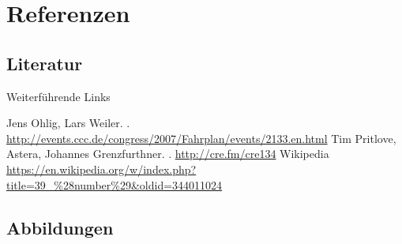\documentclass{beamer}
\begin{document}
\appendix

\section{Referenzen}

\subsection{Literatur}

\begin{frame}{Weiterführende Links}
    \begin{thebibliography}{XX}
        \beamertemplatetextbibitems
            Jens Ohlig, Lars Weiler.
            .
            \footnotesize
            \newblock \url{http://events.ccc.de/congress/2007/Fahrplan/events/2133.en.html}
            \normalsize
            Tim Pritlove, Astera, Johannes Grenzfurthner.
            .
            \newblock \url{http://cre.fm/cre134}
            Wikipedia
            \scriptsize
            \newblock \url{https://en.wikipedia.org/w/index.php?title=39\_\%28number\%29\&oldid=344011024}
            \normalsize
    \end{thebibliography}
\end{frame}

\subsection{Abbildungen}
\end{document}
